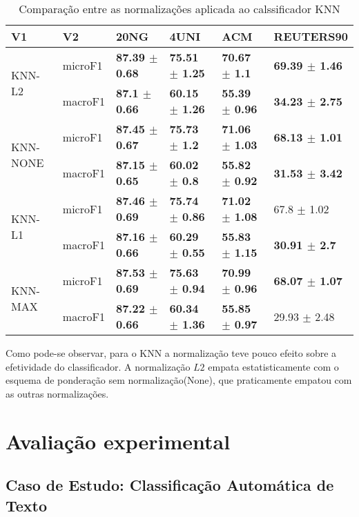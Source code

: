 \documentclass[]{book}
\begin{document}
\begin{table}[ht]
\centering
\begin{tabular}{llllll}
  \hline
V1 & V2 & 20NG & 4UNI & ACM & REUTERS90 \\ 
  \cline{3-6} \hline
\multirow{2}{*}{KNN-L2} & microF1 & \bf{87.39 $\pm$  0.68} & \bf{75.51 $\pm$  1.25} & \bf{70.67 $\pm$  1.1} & \bf{69.39 $\pm$  1.46} \\ 
   & macroF1 & \bf{87.1 $\pm$  0.66} & \bf{60.15 $\pm$  1.26} & \bf{55.39 $\pm$  0.96} & \bf{34.23 $\pm$  2.75} \\ 
   \cline{3-6}\multirow{2}{*}{KNN-NONE} & microF1 & \bf{87.45 $\pm$  0.67} & \bf{75.73 $\pm$  1.2} & \bf{71.06 $\pm$  1.03} & \bf{68.13 $\pm$  1.01} \\ 
   & macroF1 & \bf{87.15 $\pm$  0.65} & \bf{60.02 $\pm$  0.8} & \bf{55.82 $\pm$  0.92} & \bf{31.53 $\pm$  3.42} \\ 
   \cline{3-6}\multirow{2}{*}{KNN-L1} & microF1 & \bf{87.46 $\pm$  0.69} & \bf{75.74 $\pm$  0.86} & \bf{71.02 $\pm$  1.08} & 67.8 $\pm$  1.02 \\ 
   & macroF1 & \bf{87.16 $\pm$  0.66} & \bf{60.29 $\pm$  0.55} & \bf{55.83 $\pm$  1.15} & \bf{30.91 $\pm$  2.7} \\ 
   \cline{3-6}\multirow{2}{*}{KNN-MAX} & microF1 & \bf{87.53 $\pm$  0.69} & \bf{75.63 $\pm$  0.94} & \bf{70.99 $\pm$  0.96} & \bf{68.07 $\pm$  1.07} \\ 
   & macroF1 & \bf{87.22 $\pm$  0.66} & \bf{60.34 $\pm$  1.36} & \bf{55.85 $\pm$  0.97} & 29.93 $\pm$  2.48 \\ 
   \cline{3-6}\end{tabular}
\caption{Comparação entre as normalizações aplicada ao calssificador KNN} 
\end{table}

Como pode-se observar, para o KNN a normalização teve pouco efeito sobre
a efetividade do classificador. A normalização \(L2\) empata
estatisticamente com o esquema de ponderação sem normalização(None), que
praticamente empatou com as outras normalizações.

\chapter{Avaliação experimental}

\section{Caso de Estudo: Classificação Automática de
Texto}\label{caso-de-estudo-classificacao-automatica-de-texto}
\end{document}
